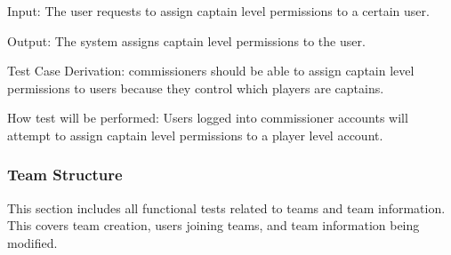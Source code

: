 \documentclass[12pt, titlepage]{article}
\begin{document}
\begin{enumerate}
  Input: The user requests to assign captain level permissions to a 
  certain user.
           
  Output: The system assigns captain level permissions to the user.
 
  Test Case Derivation: commissioners should be able to assign captain level
  permissions to users because they control which players are captains.
 
  How test will be performed: Users logged into commissioner accounts will attempt
  to assign captain level permissions to a player level account.

\end{enumerate}

\subsubsection{Team Structure}

This section includes all functional tests related to teams and team
information. This covers team creation, users joining teams, and team
information being modified.
\end{document}
